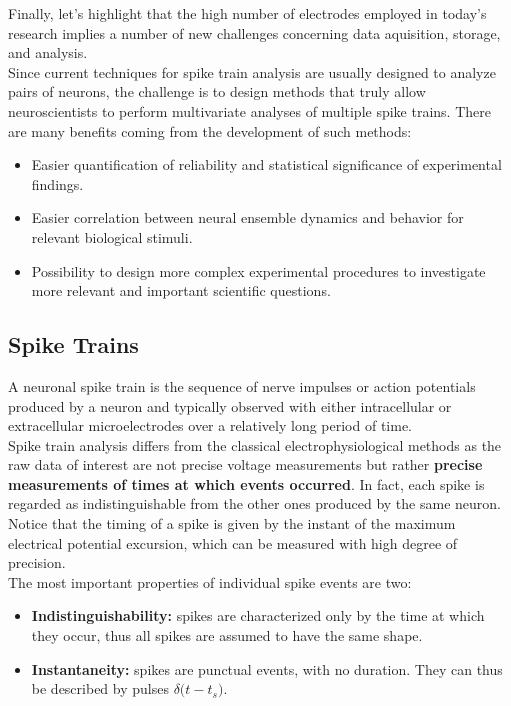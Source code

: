 Finally, let's highlight that the high number of electrodes employed in 
today's research implies a number of new challenges concerning data 
aquisition, storage, and analysis.\\
Since current techniques for spike train analysis are usually designed to 
analyze pairs of neurons, the challenge is to design methods 
that truly allow neuroscientists to perform multivariate analyses of 
multiple spike trains.
There are many benefits coming from the development of such methods:
\begin{itemize}
    \item Easier quantification of reliability and statistical 
significance of experimental findings.
    \item Easier correlation between neural ensemble dynamics and behavior 
for relevant biological stimuli.
    \item Possibility to design more complex experimental procedures to 
investigate more relevant and important scientific questions.
\end{itemize}

\subsection{Spike Trains}
A neuronal spike train is the sequence of nerve impulses or action 
potentials produced by a neuron and typically observed with either 
intracellular or extracellular microelectrodes over a relatively long 
period of time.\\
Spike train analysis differs from the classical electrophysiological methods 
as the raw data of interest are not precise voltage measurements but 
rather \textbf{precise measurements of times at which events occurred}. In 
fact, each spike is regarded as indistinguishable from the other ones produced by
the same neuron. Notice that the timing of a spike is given by the instant
of the maximum electrical potential excursion, which can be measured with
high degree of precision.\\
The most important properties of individual spike events are two:

\begin{itemize}
    \item \textbf{Indistinguishability:} spikes are characterized only by the
    time at which they occur, thus all spikes are assumed to have the same shape.
    \item \textbf{Instantaneity:} spikes are punctual events, with no duration.
    They can thus be described by pulses \(\delta\bigl(t-t_s\bigr)\).
\end{itemize}

